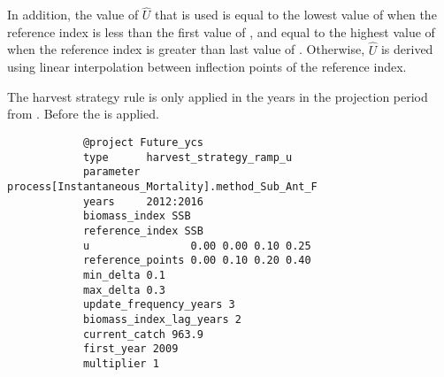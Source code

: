 In addition, the value of $\hat{U}$ that is used is equal to the lowest value of  when the reference index is less than the first value of , and equal to the highest value of  when the reference index is greater than last value of . Otherwise, $\hat{U}$ is derived using linear interpolation between inflection points of the reference index.


The harvest strategy rule is only applied in the years in the projection period from . Before  the  is applied.

{\small{\begin{verbatim}
			@project Future_ycs
			type      harvest_strategy_ramp_u
			parameter process[Instantaneous_Mortality].method_Sub_Ant_F
			years     2012:2016
			biomass_index SSB
			reference_index SSB
			u                0.00 0.00 0.10 0.25
			reference_points 0.00 0.10 0.20 0.40 
			min_delta 0.1
			max_delta 0.3
			update_frequency_years 3
			biomass_index_lag_years 2
			current_catch 963.9
			first_year 2009
			multiplier 1
\end{verbatim}}}


